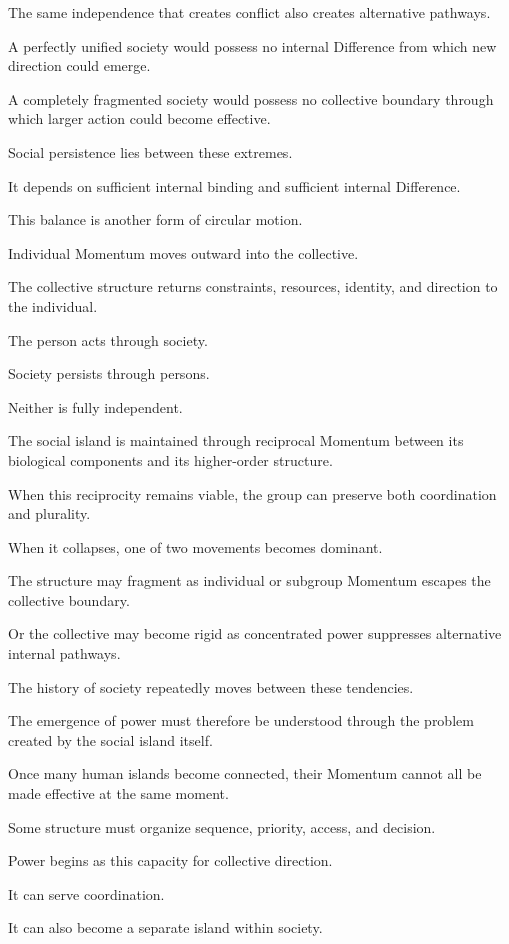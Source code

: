 The same independence that creates conflict also creates alternative pathways.

A perfectly unified society would possess no internal Difference from which new direction could emerge.

A completely fragmented society would possess no collective boundary through which larger action could become effective.

Social persistence lies between these extremes.

It depends on sufficient internal binding and sufficient internal Difference.

This balance is another form of circular motion.

Individual Momentum moves outward into the collective.

The collective structure returns constraints, resources, identity, and direction to the individual.

The person acts through society.

Society persists through persons.

Neither is fully independent.

The social island is maintained through reciprocal Momentum between its biological components and its higher-order structure.

When this reciprocity remains viable, the group can preserve both coordination and plurality.

When it collapses, one of two movements becomes dominant.

The structure may fragment as individual or subgroup Momentum escapes the collective boundary.

Or the collective may become rigid as concentrated power suppresses alternative internal pathways.

The history of society repeatedly moves between these tendencies.

The emergence of power must therefore be understood through the problem created by the social island itself.

Once many human islands become connected, their Momentum cannot all be made effective at the same moment.

Some structure must organize sequence, priority, access, and decision.

Power begins as this capacity for collective direction.

It can serve coordination.

It can also become a separate island within society.

